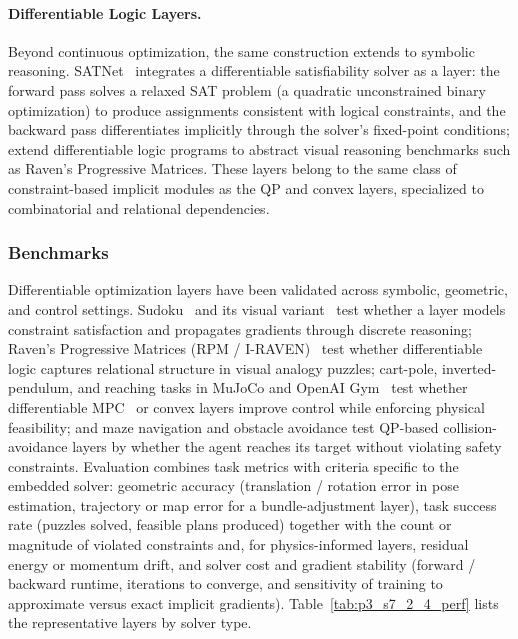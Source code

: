 \paragraph{Differentiable Logic Layers.}
Beyond continuous optimization, the same construction extends to symbolic reasoning.
SATNet~\cite{wang2019satnet} integrates a differentiable satisfiability solver as a layer: the forward pass solves a relaxed SAT problem (a quadratic unconstrained binary optimization) to produce assignments consistent with logical constraints, and the backward pass differentiates implicitly through the solver's fixed-point conditions; \citet{shindo2024learning} extend differentiable logic programs to abstract visual reasoning benchmarks such as Raven's Progressive Matrices.
These layers belong to the same class of constraint-based implicit modules as the QP and convex layers, specialized to combinatorial and relational dependencies.


\subsubsection{Benchmarks}
Differentiable optimization layers have been validated across symbolic, geometric, and control settings.
Sudoku~\cite{amos2017optnet,wang2019satnet} and its visual variant~\cite{gould2022exploiting} test whether a layer models constraint satisfaction and propagates gradients through discrete reasoning; Raven's Progressive Matrices (RPM / I-RAVEN)~\cite{shindo2024learning} test whether differentiable logic captures relational structure in visual analogy puzzles; cart-pole, inverted-pendulum, and reaching tasks in MuJoCo and OpenAI Gym~\cite{agrawal2019differentiable} test whether differentiable MPC~\cite{amos2018differentiable} or convex layers improve control while enforcing physical feasibility; and maze navigation and obstacle avoidance test QP-based collision-avoidance layers by whether the agent reaches its target without violating safety constraints.
Evaluation combines task metrics with criteria specific to the embedded solver: geometric accuracy (translation / rotation error in pose estimation, trajectory or map error for a bundle-adjustment layer), task success rate (puzzles solved, feasible plans produced) together with the count or magnitude of violated constraints and, for physics-informed layers, residual energy or momentum drift, and solver cost and gradient stability (forward / backward runtime, iterations to converge, and sensitivity of training to approximate versus exact implicit gradients).
Table~\ref{tab:p3_s7_2_4_perf} lists the representative layers by solver type.

